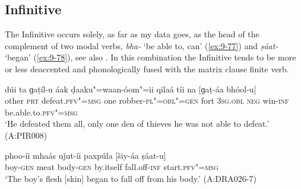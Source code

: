 \subsection{Infinitive}
\label{subsec:9-3-6}

The Infinitive occurs solely, as far as my data goes, as the head of the complement of two modal
verbs, \textit{bha-} `be able to, can' (\ref{ex:9-77}) and \textit{ṣáat-} `began' (\ref{ex:9-78}), see also
. In this combination the Infinitive tends to be more or less deaccented and phonologically
fused with the matrix clause finite verb.

\begin{exe}
\ex
\label{ex:9-77}
\gll dúi ta ɡaṭíl-u áak ḍaaku"=waan-óom"=ii qilaá tíi na [ɡaṭ-áa bhóol-u]  \\
other \textsc{prt} defeat.\textsc{pfv"=msg} one robber-\textsc{pl"=obl"=gen}  fort \textsc{3sg.obl} \textsc{neg} win-\textsc{inf} be.able.to.\textsc{pfv"=msg} \\
\glt `He defeated them all, only one den of thieves he was not able to defeat.' (A:PIR008)

\ex
\label{ex:9-78}
\gll phoo-íi mhaás uǰut-íi paxpúla [šiy-áa ṣáat-u] \\
boy-\textsc{gen} meat body-\textsc{gen} by.itself fall.off-\textsc{inf} start.\textsc{pfv"=msg} \\
\glt `The boy's flesh [skin] began to fall off from his body.' (A:DRA026-7) 
\end{exe}
